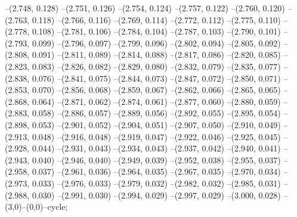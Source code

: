 {--(2.748, 0.128)
--(2.751, 0.126)
--(2.754, 0.124)
--(2.757, 0.122)
--(2.760, 0.120)
--(2.763, 0.118)
--(2.766, 0.116)
--(2.769, 0.114)
--(2.772, 0.112)
--(2.775, 0.110)
--(2.778, 0.108)
--(2.781, 0.106)
--(2.784, 0.104)
--(2.787, 0.103)
--(2.790, 0.101)
--(2.793, 0.099)
--(2.796, 0.097)
--(2.799, 0.096)
--(2.802, 0.094)
--(2.805, 0.092)
--(2.808, 0.091)
--(2.811, 0.089)
--(2.814, 0.088)
--(2.817, 0.086)
--(2.820, 0.085)
--(2.823, 0.083)
--(2.826, 0.082)
--(2.829, 0.080)
--(2.832, 0.079)
--(2.835, 0.077)
--(2.838, 0.076)
--(2.841, 0.075)
--(2.844, 0.073)
--(2.847, 0.072)
--(2.850, 0.071)
--(2.853, 0.070)
--(2.856, 0.068)
--(2.859, 0.067)
--(2.862, 0.066)
--(2.865, 0.065)
--(2.868, 0.064)
--(2.871, 0.062)
--(2.874, 0.061)
--(2.877, 0.060)
--(2.880, 0.059)
--(2.883, 0.058)
--(2.886, 0.057)
--(2.889, 0.056)
--(2.892, 0.055)
--(2.895, 0.054)
--(2.898, 0.053)
--(2.901, 0.052)
--(2.904, 0.051)
--(2.907, 0.050)
--(2.910, 0.049)
--(2.913, 0.048)
--(2.916, 0.048)
--(2.919, 0.047)
--(2.922, 0.046)
--(2.925, 0.045)
--(2.928, 0.044)
--(2.931, 0.043)
--(2.934, 0.043)
--(2.937, 0.042)
--(2.940, 0.041)
--(2.943, 0.040)
--(2.946, 0.040)
--(2.949, 0.039)
--(2.952, 0.038)
--(2.955, 0.037)
--(2.958, 0.037)
--(2.961, 0.036)
--(2.964, 0.035)
--(2.967, 0.035)
--(2.970, 0.034)
--(2.973, 0.033)
--(2.976, 0.033)
--(2.979, 0.032)
--(2.982, 0.032)
--(2.985, 0.031)
--(2.988, 0.030)
--(2.991, 0.030)
--(2.994, 0.029)
--(2.997, 0.029)
--(3.000, 0.028)
--(3,0)--(0,0)--cycle;
}

